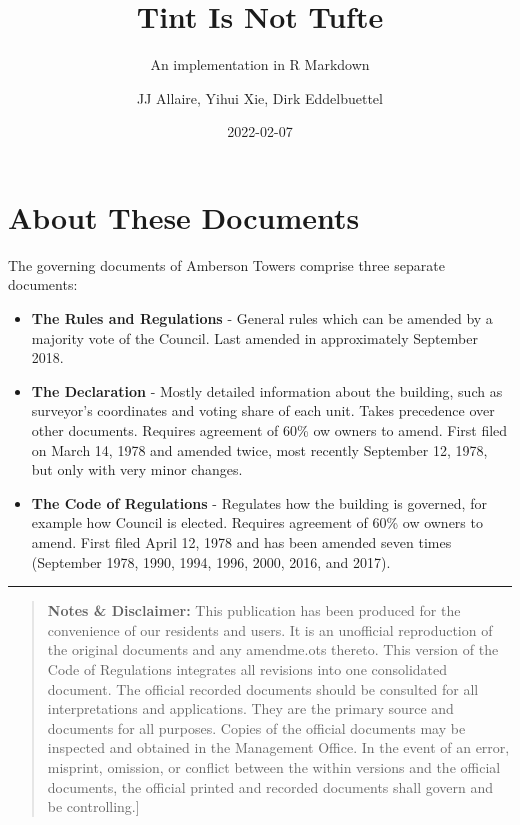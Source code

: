 \documentclass[
]{book}
\title{Tint Is Not Tufte}
\subtitle{An implementation in R Markdown}
\author{JJ Allaire, Yihui Xie, Dirk Eddelbuettel}
\date{2022-02-07}
\begin{document}
\maketitle

{
\setcounter{tocdepth}{1}
\tableofcontents
}
\hypertarget{about-these-documents}{%
\chapter*{About These Documents}\label{about-these-documents}}

The governing documents of Amberson Towers comprise three separate documents:

\begin{itemize}
\item
  \textbf{The Rules and Regulations} - General rules which can be amended by a majority vote of the Council. Last amended in approximately September 2018.
\item
  \textbf{The Declaration} - Mostly detailed information about the building, such as surveyor's coordinates and voting share of each unit. Takes precedence over other documents. Requires agreement of 60\% ow owners to amend. First filed on March 14, 1978 and amended twice, most recently September 12, 1978, but only with very minor changes.
\item
  \textbf{The Code of Regulations} - Regulates how the building is governed, for example how Council is elected. Requires agreement of 60\% ow owners to amend. First filed April 12, 1978 and has been amended seven times (September 1978, 1990, 1994, 1996, 2000, 2016, and 2017).
\end{itemize}

\begin{center}\rule{0.5\linewidth}{0.5pt}\end{center}

\begin{quote}
\textbf{Notes \& Disclaimer:} This publication has been produced for the convenience of our residents and users. It is an unofficial reproduction of the original documents and any amendme.ots thereto. This version of the Code of Regulations integrates all revisions into one consolidated document. The official recorded documents should be consulted for all interpretations and applications. They are the primary source and documents for all purposes. Copies of the official documents may be inspected and obtained in the Management Office. In the event of an error, misprint, omission, or conflict between the within versions and the official documents, the official printed and recorded documents shall govern and be controlling.{]}
\end{quote}
\end{document}
